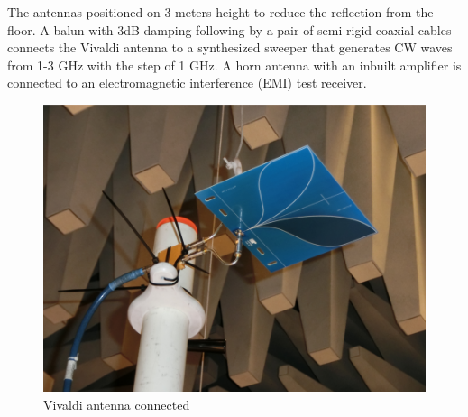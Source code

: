 The antennas positioned on 3 meters height to reduce the reflection from the floor. A balun with 3dB damping following by a pair of semi rigid coaxial cables connects the Vivaldi antenna to a synthesized sweeper that generates CW waves from 1-3 GHz with the step of 1 GHz. A horn antenna with an inbuilt amplifier is connected to an electromagnetic interference (EMI) test receiver. 
\begin{figure}[t] 
\includegraphics[width=\linewidth]{Figures/vivaldiHorizontal.png}
\caption{Vivaldi antenna connected } 
\label{fig:MeasuredAntenna}
\end{figure}


